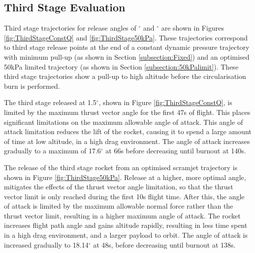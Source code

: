 \subsection{Third Stage Evaluation}

Third stage trajectories for release angles of \SeparationAngleConstq $^\circ$ and \SeparationAngleFiftykPa $^\circ$ are shown in Figures \ref{fig:ThirdStageConstQ} and \ref{fig:ThirdStage50kPa}. 
These trajectories correspond to third stage release points at the end of a constant dynamic pressure trajectory with minimum pull-up (as shown in Section \ref{subsection:Fixed}) and an optimised 50kPa limited trajectory  (as shown in Section \ref{subsection:50kPalimit}). 
These third stage trajectories show a pull-up to high altitude before the circularisation burn is performed. 

The third stage released at 1.5$^\circ$, shown in Figure \ref{fig:ThirdStageConstQ}, is limited by the maximum thrust vector angle for the first 47s of flight. This places significant limitations on the maximum allowable angle of attack. This angle of attack limitation reduces the lift of the rocket, causing it to spend a large amount of time at low altitude, in a high drag environment. The angle of attack increases gradually to a maximum of 17.6$^\circ$ at 66s before decreasing until burnout at 140s. 

The release of the third stage rocket from an optimised scramjet trajectory is shown in Figure \ref{fig:ThirdStage50kPa}. Release at a higher, more optimal angle, mitigates the effects of the thrust vector angle limitation, so that the thrust vector limit is only reached during the first 10s flight time. After this, the angle of attack is limited by the maximum allowable normal force rather than the thrust vector limit, resulting in a higher maximum angle of attack. The rocket increases flight path angle and gains altitude rapidly, resulting in less time spent in a high drag environment, and a larger payload to orbit.  The angle of attack is increased gradually to 18.14$^\circ$ at 48s, before decreasing until burnout at 138s.

